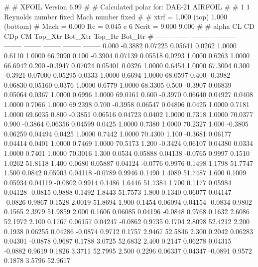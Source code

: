 #  
#       XFOIL         Version 6.99
#  
# Calculated polar for: DAE-21 AIRFOIL                                  
#  
# 1 1 Reynolds number fixed          Mach number fixed         
#  
# xtrf =   1.000 (top)        1.000 (bottom)  
# Mach =   0.000     Re =     0.045 e 6     Ncrit =   9.000  9.000
#  
#   alpha    CL        CD       CDp       CM     Top_Xtr  Bot_Xtr  Top_Itr  Bot_Itr
#  ------ -------- --------- --------- -------- -------- -------- -------- --------
   0.000  -0.3882   0.07225   0.05641   0.0262   1.0000   0.6110   1.0000  66.2090
   0.100  -0.3904   0.07139   0.05518   0.0293   1.0000   0.6263   1.0000  66.6942
   0.200  -0.3947   0.07024   0.05401   0.0326   1.0000   0.6454   1.0000  67.3004
   0.300  -0.3921   0.07000   0.05295   0.0333   1.0000   0.6694   1.0000  68.0597
   0.400  -0.3982   0.06830   0.05160   0.0376   1.0000   0.6779   1.0000  68.3305
   0.500  -0.3907   0.06839   0.05064   0.0367   1.0000   0.6996   1.0000  69.0161
   0.600  -0.3970   0.06640   0.04927   0.0408   1.0000   0.7066   1.0000  69.2398
   0.700  -0.3958   0.06547   0.04806   0.0425   1.0000   0.7181   1.0000  69.6035
   0.800  -0.3851   0.06516   0.04723   0.0402   1.0000   0.7318   1.0000  70.0377
   0.900  -0.3864   0.06356   0.04599   0.0425   1.0000   0.7380   1.0000  70.2327
   1.000  -0.3805   0.06259   0.04494   0.0425   1.0000   0.7442   1.0000  70.4300
   1.100  -0.3681   0.06177   0.04414   0.0401   1.0000   0.7469   1.0000  70.5173
   1.200  -0.3424   0.06107   0.04380   0.0334   1.0000   0.7401   1.0000  70.3016
   1.300   0.0534   0.05888   0.04138  -0.0765   0.9997   0.1510   1.0262  51.8118
   1.400   0.0680   0.05887   0.04124  -0.0776   0.9976   0.1498   1.1798  51.7747
   1.500   0.0842   0.05903   0.04118  -0.0789   0.9946   0.1490   1.4089  51.7487
   1.600   0.1009   0.05934   0.04119  -0.0802   0.9914   0.1486   1.6446  51.7384
   1.700   0.1177   0.05984   0.04128  -0.0815   0.9888   0.1492   1.8443  51.7573
   1.800   0.1340   0.06077   0.04147  -0.0826   0.9867   0.1528   2.0019  51.8694
   1.900   0.1454   0.06094   0.04154  -0.0834   0.9802   0.1565   2.3979  51.9859
   2.000   0.1606   0.06085   0.04196  -0.0848   0.9768   0.1632   2.6086  52.1972
   2.100   0.1767   0.06157   0.04247  -0.0862   0.9735   0.1704   2.8098  52.4212
   2.200   0.1938   0.06255   0.04286  -0.0874   0.9712   0.1757   2.9467  52.5846
   2.300   0.2042   0.06283   0.04301  -0.0878   0.9687   0.1788   3.0725  52.6832
   2.400   0.2147   0.06278   0.04315  -0.0882   0.9619   0.1826   3.3711  52.7995
   2.500   0.2296   0.06337   0.04347  -0.0891   0.9572   0.1878   3.5796  52.9617
